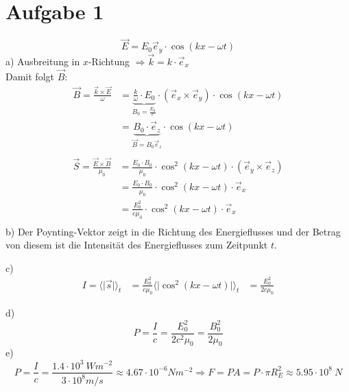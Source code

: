 \documentclass[11pt a4paper]{article}
\begin{document}
\thispagestyle{fancy}

\section*{Aufgabe 1}
\[ \vec E = E_0 \vec e_y \cdot \cos(kx - \omega t) \]
a) Ausbreitung in $x$-Richtung $\Rightarrow \vec k = k \cdot \vec e_x $ \\
Damit folgt $\vec B$:
\begin{align*}
	\vec B = \frac{\vec k \times \vec E}{\omega} 
	&= \underbrace{\frac{k}{\omega} \cdot E_0}_{B_0 = \frac{E_0}{c}}
		\cdot (\vec e_x \times \vec e_y) \cdot \cos(kx - \omega t) \\
	&= \underbrace{B_0 \cdot \vec e_z}_{\vec B = B_0 \vec e_z} \cdot \cos(kx - \omega t) \\
\end{align*}
\begin{align*}
	\vec S = \frac{\vec E \times \vec B}{\mu_0}
	&= \frac{E_0 \cdot B_0}{\mu_0} \cdot \cos^2(kx - \omega t) \cdot (\vec e_y \times \vec e_z) \\
	&= \frac{E_0 \cdot B_0}{\mu_0} \cdot \cos^2(kx - \omega t) \cdot \vec e_x \\
	&= \frac{E_0^2}{c \mu_0} \cdot \cos^2(kx - \omega t) \cdot \vec e_x \\
\end{align*}
b) Der Poynting-Vektor zeigt in die Richtung des Energieflusses und der Betrag von diesem ist die Intensität des 
Energieflusses zum Zeitpunkt $t$.

\vspace{0.5cm}
\noindent 
c)
\begin{align*}
	I = \langle \vert \vec s \vert \rangle_t 
	&= \frac{E_0^2}{c\mu_0} \langle \vert \cos^2(kx - \omega t) \vert \rangle_t
	&= \frac{E_0^2}{2c\mu_0}
\end{align*}

\vspace{0.5cm}
\noindent 
d)
\[ P = \frac{I}{c} = \frac{E_0^2}{2c^2\mu_0} = \frac{B_0^2}{2\mu_0} \]
e) 
\[ P = \frac{I}{c} = \frac{1.4 \cdot 10^3 \ Wm^{-2}}{3 \cdot 10^8 m/s} \approx 4.67 \cdot 10^{-6} Nm^{-2} 
\Rightarrow 
F = PA = P \cdot \pi R_E^2 \approx 5.95 \cdot 10^{8} \ N 
\]
\end{document}

